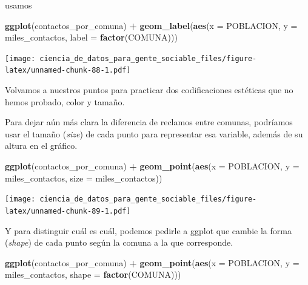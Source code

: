 \documentclass[spanish,]{book}
\newenvironment{Shaded}{\begin{snugshade}}{\end{snugshade}}
\newcommand{\DataTypeTok}[1]{\textcolor[rgb]{0.13,0.29,0.53}{#1}}
\newcommand{\KeywordTok}[1]{\textcolor[rgb]{0.13,0.29,0.53}{\textbf{#1}}}
\newcommand{\NormalTok}[1]{#1}
\newcommand{\OperatorTok}[1]{\textcolor[rgb]{0.81,0.36,0.00}{\textbf{#1}}}
\newcommand{\StringTok}[1]{\textcolor[rgb]{0.31,0.60,0.02}{#1}}
\begin{document}
usamos

\begin{Shaded}
\begin{Highlighting}[]
\KeywordTok{ggplot}\NormalTok{(contactos_por_comuna) }\OperatorTok{+}
\StringTok{    }\KeywordTok{geom_label}\NormalTok{(}\KeywordTok{aes}\NormalTok{(}\DataTypeTok{x =}\NormalTok{ POBLACION, }\DataTypeTok{y =}\NormalTok{ miles_contactos, }\DataTypeTok{label =} \KeywordTok{factor}\NormalTok{(COMUNA)))}
\end{Highlighting}
\end{Shaded}

\texttt{[image: ciencia\_de\_datos\_para\_gente\_sociable\_files/figure-latex/unnamed-chunk-88-1.pdf]}

Volvamos a nuestros puntos para practicar dos codificaciones estéticas que no hemos probado, color y tamaño.

Para dejar aún más clara la diferencia de reclamos entre comunas, podríamos usar el tamaño (\emph{size}) de cada punto para representar esa variable, además de su altura en el gráfico.

\begin{Shaded}
\begin{Highlighting}[]
\KeywordTok{ggplot}\NormalTok{(contactos_por_comuna) }\OperatorTok{+}\StringTok{ }
\StringTok{    }\KeywordTok{geom_point}\NormalTok{(}\KeywordTok{aes}\NormalTok{(}\DataTypeTok{x =}\NormalTok{ POBLACION, }\DataTypeTok{y =}\NormalTok{ miles_contactos, }\DataTypeTok{size =}\NormalTok{ miles_contactos))}
\end{Highlighting}
\end{Shaded}

\texttt{[image: ciencia\_de\_datos\_para\_gente\_sociable\_files/figure-latex/unnamed-chunk-89-1.pdf]}

Y para distinguir cuál es cuál, podemos pedirle a ggplot que cambie la forma (\emph{shape}) de cada punto según la comuna a la que corresponde.

\begin{Shaded}
\begin{Highlighting}[]
\KeywordTok{ggplot}\NormalTok{(contactos_por_comuna) }\OperatorTok{+}\StringTok{ }
\StringTok{    }\KeywordTok{geom_point}\NormalTok{(}\KeywordTok{aes}\NormalTok{(}\DataTypeTok{x =}\NormalTok{ POBLACION, }\DataTypeTok{y =}\NormalTok{ miles_contactos, }\DataTypeTok{shape =} \KeywordTok{factor}\NormalTok{(COMUNA)))}
\end{Highlighting}
\end{Shaded}
\end{document}
